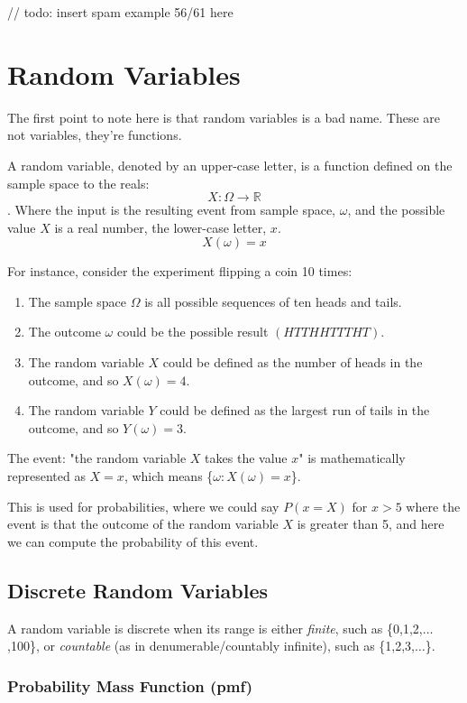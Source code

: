 \documentclass{article}
\begin{document}
// todo: insert spam example 56/61 here


\section{Random Variables}

The first point to note here is that random variables is a bad name. These are not variables, they're functions.

A random variable, denoted by an upper-case letter, is a function defined on the sample  space to the reals: $$X: \Omega \rightarrow \mathbb{R}$$. 
Where the input is the resulting event from sample space, $\omega$, and the possible value $X$ is a real number, the lower-case letter, $x$.
$$X(\omega) = x$$

For instance, consider the experiment flipping a coin 10 times:
\begin{enumerate}
\item The sample space $\Omega$ is all possible sequences of ten heads  and tails.
\item The outcome $\omega$ could be the possible result $(HTTHHTTTHT)$.
\item The random variable $X$ could be defined as the number of heads in the outcome, and so $X(\omega) = 4$.
\item The random variable $Y$  could be defined as the largest run of tails in the outcome, and so $Y(\omega) = 3$.
\end{enumerate}


The event: "the random variable $X$ takes the value $x$" is mathematically represented as $X=x$, which means \{$\omega: X(\omega) = x$\}. 

This is used for probabilities, where we could say $P(x = X)$ for $x>5$ where the event is that the outcome of the random variable $X$ is greater than 5, and here we can compute the probability of this event.

\subsection{Discrete Random Variables}

A random variable is discrete when its range is either \textit{finite}, such as \{0,1,2,$\dots$,100\}, or \textit{countable} (as in denumerable/countably infinite), such as \{1,2,3,$\dots$\}.

\subsubsection{Probability Mass Function (pmf)}
\end{document}
